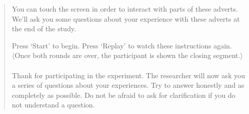 \begin{quotation}
	You can touch the screen in order to interact with parts of these adverts. We'll ask you some questions about your experience with these adverts at the end of the study.

	Press `Start' to begin. Press `Replay' to watch these instructions again.\\
	
	\noindent $\langle$Once both rounds are over, the participant is shown the closing segment.$\rangle$\\

	\\

	Thank for participating in the experiment. The researcher will now ask you a series of questions about your experiences. Try to answer honestly and as completely as possible. Do not be afraid to ask for clarification if you do not understand a question.\\

	\noindent [END]

\end{quotation}